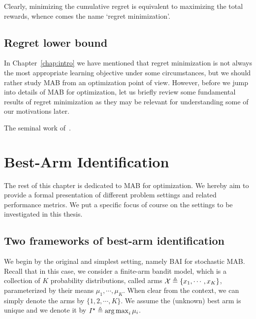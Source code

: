 Clearly, minimizing the cumulative regret is equivalent to maximizing the total rewards, whence comes the name `regret minimization'. 

\subsection{Regret lower bound}

In Chapter~\ref{chap:intro} we have mentioned that regret minimization is not always the most appropriate learning objective under some circumstances, but we should rather study MAB from an optimization point of view. However, before we jump into details of MAB for optimization, let us briefly review some fundamental results of regret minimization as they may be relevant for understanding some of our motivations later.

The seminal work of~\cite{robbins1952}.

\section{Best-Arm Identification}\label{sec:mab.bai}

The rest of this chapter is dedicated to MAB for optimization. We hereby aim to provide a formal presentation of different problem settings and related performance metrics. We put a specific focus of course on the settings to be investigated in this thesis.

\subsection{Two frameworks of best-arm identification}\label{sec:mab.bai.frameworks}

We begin by the original and simplest setting, namely BAI for stochastic MAB. Recall that in this case, we consider a finite-arm bandit model, which is a collection of $K$ probability distributions, called arms $\mathcal{X}\triangleq\{x_1,\cdots,x_K\}$, parameterized by their means $\mu_1, \cdots, \mu_K$. When clear from the context, we can simply denote the arms by $\{1,2,\cdots,K\}$. We assume the (unknown) best arm is unique and we denote it by $I^\star \triangleq \operatorname*{arg\,max}_i \mu_i$. 

